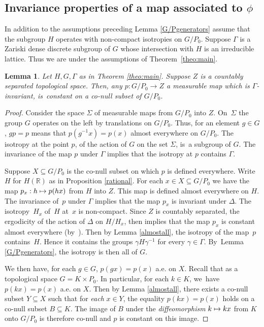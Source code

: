 \documentclass[10pt,a4paper]{amsart}
\def\mto{\mathchoice{\longmapsto}{\mapsto}{\mapsto}{\mapsto}}
\newtheorem{lemma}{Lemma}
\theoremstyle{definition}
\newcommand{\field}[1]{\mathbb{#1}}
\newcommand{\R}{\field{R}}
\let\D\Delta
\let\g\gamma
\let\G\Gamma
\begin{document}
\subsection{Invariance properties of a map associated to $\phi$}

In addition to the assumptions preceding Lemma \ref{G/Pgenerators} assume that the subgroup $H$ operates with non-compact isotropies on $G/P_0$. Suppose $\G$ is a Zariski dense discrete subgroup of $G$ whose intersection with $H$ is an irreducible lattice. Thus we are under the assumptions of Theorem~\ref{theo:main}.

\begin{lemma} \label{constantp} Let $H,G,\Gamma$ as in Theorem \ref{theo:main}. Suppose $Z$ is a countably separated topological space. Then, any $p: G/P_0 \to Z$ a measurable map which is $\G$-invariant, is~constant on a co-null subset of $G/P_0$.
\end{lemma}

\begin{proof} Consider the space $\Sigma $ of measurable maps from $G/P_0$ into $Z$. On~$\Sigma$ the group $G$ operates on the left by translations on $G/P_0$. Thus, for an element $g\in G$, $gp=p$ means that $p(g^{-1}x)=p(x)$ almost everywhere on $G/P_0$. The isotropy at the point $p$, of the action of $G$ on the set $\Sigma $, is~a subgroup of $G$. The invariance of the map $p$ under $\G$ implies that the isotropy at $p$ contains $\G$.

Suppose $X\subseteq G/P_0$ is the co-null subset on which $p$ is defined everywhere. Write~$H$ for $H(\R)$ as in Proposition \ref{rational}. For each $x\in X\subseteq G/P_0$ we have the map \hbox{$p_x: h\mto p(hx)$} from $H$ into $Z$. This map is defined almost everywhere on $H$. The invariance of~$p$ under $\Gamma $ implies that the map $p_x$ is invariant under $\D$. The isotropy~$H_x$ of~$H$ at~$x$ is non-compact. Since $Z$ is countably separated, the ergodicity of the action of $\D$ on $H/H_x$, then implies that the map $p_x$ is constant almost everywhere (by~\cite[Prop.\,(2.1.11)]{Z}). Then by Lemma \ref{almostall}, the isotropy of the map~$p$ contains~$H$. Hence it contains the groups $\g H \g ^{-1}$ for every $\g \in \G$. By~Lemma \ref{G/Pgenerators}, the isotropy is then all of $G$.

We then have, for each $g\in G$, $p(gx)=p(x)$ a.e. on $X$. Recall that as a topological space $G=K\times P_0$. In particular, for each $k\in K$, we~have $p(kx)=p(x)$ a.e. on $X$. Then by Lemma \ref{almostall}, there exists a co-null subset $Y\subseteq X$ such that for \emph{each} $x\in Y$, the equality $p(kx)=p(x)$ holds on a co-null subset $B \subseteq K$. The image of $B$ under the \emph{diffeomorphism} $k\mto kx$ from $K$ onto $G/P_0$ is therefore co-null and $p$ is constant on this image.
\end{proof}
\end{document}
